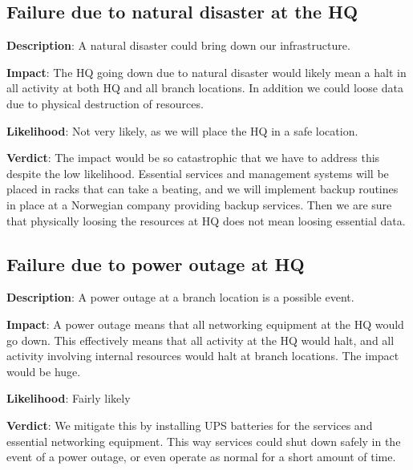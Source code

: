 \subsection{Failure due to natural disaster at the HQ}

\textbf{Description}: A natural disaster could bring down our infrastructure.

\textbf{Impact}: The HQ going down due to natural disaster would likely mean a halt in all activity at both HQ and all branch locations. In addition we could loose data due to physical destruction of resources.

\textbf{Likelihood}: Not very likely, as we will place the HQ in a safe location.

\textbf{Verdict}: The impact would be so catastrophic that we have to address this despite the low likelihood. Essential services and management systems will be placed in racks that can take a beating, and we will implement backup routines in place at a Norwegian company providing backup services. Then we are sure that physically loosing the resources at HQ does not mean loosing essential data.

\subsection{Failure due to power outage at HQ}

\textbf{Description}: A power outage at a branch location is a possible event.

\textbf{Impact}: A power outage means that all networking equipment at the HQ would go down. This effectively means that all activity at the HQ would halt, and all activity involving internal resources would halt at branch locations. The impact would be huge.

\textbf{Likelihood}: Fairly likely

\textbf{Verdict}: We mitigate this by installing UPS batteries for the services and essential networking equipment. This way services could shut down safely in the event of a power outage, or even operate as normal for a short amount of time.


